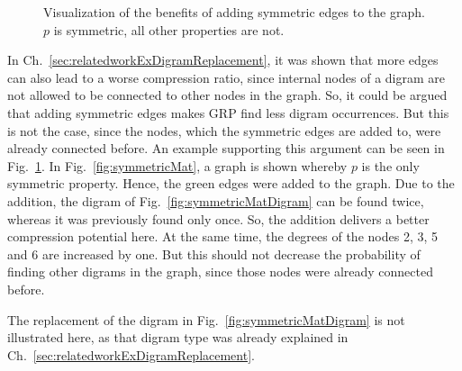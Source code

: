 \begin{figure}[h]
	\centering
	\hfill
	\caption{Visualization of the benefits of adding symmetric edges to the graph. $p$ is symmetric, all other properties are not.}
	\label{fig:symmetricMatIndirect}
\end{figure}

In Ch.~\ref{sec:relatedworkExDigramReplacement}, it was shown that more edges can also lead to a worse compression ratio, since internal nodes of a digram are not allowed to be connected to other nodes in the graph. So, it could be argued that adding symmetric edges makes GRP find less digram occurrences. But this is not the case, since the nodes, which the symmetric edges are added to, were already connected before. An example supporting this argument can be seen in Fig.~\ref{fig:symmetricMatIndirect}. In Fig.~\ref{fig:symmetricMat}, a graph is shown whereby $p$ is the only symmetric property. Hence, the green edges were added to the graph. Due to the addition, the digram of Fig.~\ref{fig:symmetricMatDigram} can be found twice, whereas it was previously found only once. So, the addition delivers a better compression potential here. At the same time, the degrees of  the nodes 2, 3, 5 and 6 are increased by one. But this should not decrease the probability of finding other digrams in the graph, since those nodes were already connected before.

The replacement of the digram in Fig.~\ref{fig:symmetricMatDigram} is not illustrated here, as that digram type was already explained in Ch.~\ref{sec:relatedworkExDigramReplacement}.



